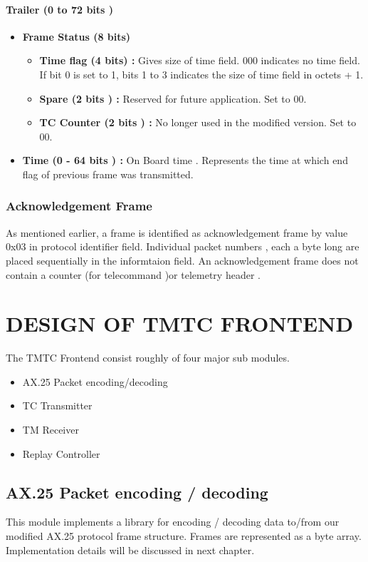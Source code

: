 \documentclass[BTech]{iitmdiss}
\begin{document}
\subsubsection{Trailer (0 to 72 bits ) }
\begin{itemize}
\item \textbf{Frame Status (8 bits) }
\begin{itemize}
\item \textbf{Time flag (4 bits) : } Gives size of time field. 000 indicates no time field. If bit 0 is set to 1, bits 1 to 3 indicates the size of time field in octets + 1.
\item \textbf{Spare (2 bits ) :} Reserved for future application. Set to 00.
\item \textbf{TC Counter (2 bits ) :} No longer used in the modified version. Set to 00.

\end{itemize}
\item \textbf{Time (0 - 64 bits ) : }On Board time . Represents the time at which end flag of previous frame was transmitted.
\end{itemize}

\subsection{Acknowledgement Frame }
As mentioned earlier, a frame is identified as acknowledgement frame by value 0x03 in protocol identifier field. Individual packet numbers , each a byte long are placed sequentially in the informtaion field. An acknowledgement frame does not contain a counter (for telecommand )or telemetry header .

 \chapter{DESIGN OF TMTC FRONTEND}
 \label{chap:design}
 The TMTC Frontend consist roughly of four major sub modules.
\begin{itemize}
\item AX.25 Packet encoding/decoding
\item TC Transmitter
\item TM Receiver
\item Replay Controller
\end{itemize}
\section{AX.25 Packet encoding / decoding }
This module implements a library for encoding / decoding data to/from our modified AX.25 protocol frame structure. Frames are represented as a byte array. Implementation details will be discussed in next chapter.
\end{document}
